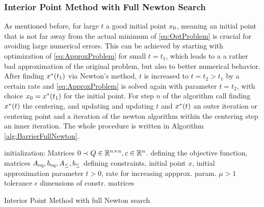 \subsubsection{Interior Point Method with Full Newton Search}
As mentioned before, for large $ t $ a good initial point $ x_0 $, meaning an initial point that is not far away from the actual minimum of \eqref{eq:OptProblem} is crucial for avoiding large numerical errors. This can be achieved by starting with optimization of \eqref{eq:ApproxProblem} for small $ t=t_1 $, which leads to a a rather bad approximation of the original problem, but also to better numerical behavior. After finding $ x^*(t_1) $ via Newton's method, $ t $ is increased to $ t= t_2 > t_1 $ by a certain rate and  \eqref{eq:ApproxProblem} is solved again with parameter $ t = t_2 $, with choice $ x_0 = x^*(t_1) $ for the initial point.
For step $ n $ of the algorithm call finding $ x^*(t) $ the centering, and updating and updating $ t $ and $ x^*(t) $ an outer iteration or centering point and a iteration of the newton algorithm within the centering step an inner iteration. The whole procedure is written in Algorithm \ref{alg:BarrierFullNewton}.


\begin{algorithm}
		\SetAlgoLined
		initialization: Matrices $ 0 \prec Q\in \mathbb{R}^{n \times n}, c\in \mathbb{R}^n. $ defining the objective function, matrices $ {A}_{\mathrm{eq}}, {b}_{\mathrm{eq}}, {A}_{\mathrm{\leq}}, {b}_{\mathrm{\leq}} $ defining constraints, initial point $ x $, initial approximation parameter $ t > 0 $, rate for increasing appprox. param. $ \mu > 1 $ tolerance $ \epsilon $ \todo dimensions of constr. matrices\\
		\caption{Interior Point Method with full Newton search}
		\label{alg:BarrierFullNewton}
\end{algorithm}




